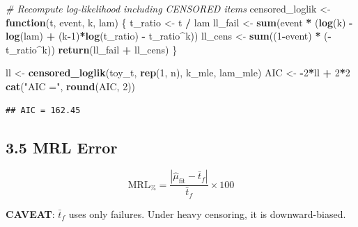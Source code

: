 \documentclass[
]{article}
\newenvironment{Shaded}{\begin{snugshade}}{\end{snugshade}}
\newcommand{\CommentTok}[1]{\textcolor[rgb]{0.56,0.35,0.01}{\textit{#1}}}
\newcommand{\ControlFlowTok}[1]{\textcolor[rgb]{0.13,0.29,0.53}{\textbf{#1}}}
\newcommand{\DecValTok}[1]{\textcolor[rgb]{0.00,0.00,0.81}{#1}}
\newcommand{\FunctionTok}[1]{\textcolor[rgb]{0.13,0.29,0.53}{\textbf{#1}}}
\newcommand{\NormalTok}[1]{#1}
\newcommand{\OtherTok}[1]{\textcolor[rgb]{0.56,0.35,0.01}{#1}}
\newcommand{\SpecialCharTok}[1]{\textcolor[rgb]{0.81,0.36,0.00}{\textbf{#1}}}
\newcommand{\StringTok}[1]{\textcolor[rgb]{0.31,0.60,0.02}{#1}}
\begin{document}
\begin{Shaded}
\begin{Highlighting}[]
\CommentTok{\# Recompute log-likelihood including CENSORED items}
\NormalTok{censored\_loglik }\OtherTok{\textless{}{-}} \ControlFlowTok{function}\NormalTok{(t, event, k, lam) \{}
\NormalTok{  t\_ratio }\OtherTok{\textless{}{-}}\NormalTok{ t }\SpecialCharTok{/}\NormalTok{ lam}
\NormalTok{  ll\_fail }\OtherTok{\textless{}{-}} \FunctionTok{sum}\NormalTok{(event }\SpecialCharTok{*}\NormalTok{ (}\FunctionTok{log}\NormalTok{(k) }\SpecialCharTok{{-}} \FunctionTok{log}\NormalTok{(lam) }\SpecialCharTok{+} \NormalTok{(k}\SpecialCharTok{{-}}\DecValTok{1}\NormalTok{)}\SpecialCharTok{*}\FunctionTok{log}\NormalTok{(t\_ratio) }\SpecialCharTok{{-}}\NormalTok{ t\_ratio}\SpecialCharTok{\^{}}\NormalTok{k))}
\NormalTok{  ll\_cens }\OtherTok{\textless{}{-}} \FunctionTok{sum}\NormalTok{((}\DecValTok{1}\SpecialCharTok{{-}}\NormalTok{event) }\SpecialCharTok{*}\NormalTok{ (}\SpecialCharTok{{-}}\NormalTok{t\_ratio}\SpecialCharTok{\^{}}\NormalTok{k))}
  \FunctionTok{return}\NormalTok{(ll\_fail }\SpecialCharTok{+}\NormalTok{ ll\_cens)}
\NormalTok{\}}

\NormalTok{ll }\OtherTok{\textless{}{-}} \FunctionTok{censored\_loglik}\NormalTok{(toy\_t, }\FunctionTok{rep}\NormalTok{(}\DecValTok{1}\NormalTok{, n), k\_mle, lam\_mle)}
\NormalTok{AIC }\OtherTok{\textless{}{-}} \SpecialCharTok{{-}}\DecValTok{2}\SpecialCharTok{*}\NormalTok{ll }\SpecialCharTok{+} \DecValTok{2}\SpecialCharTok{*}\DecValTok{2}
\FunctionTok{cat}\NormalTok{(}\StringTok{"AIC ="}\NormalTok{, }\FunctionTok{round}\NormalTok{(AIC, }\DecValTok{2}\NormalTok{))}
\end{Highlighting}
\end{Shaded}

\begin{verbatim}
## AIC = 162.45
\end{verbatim}

\subsection{3.5 MRL Error}\label{mrl-error}

\[\text{MRL}_{\%} = \frac{|\hat{\mu}_{\text{fit}} - \bar{t}_f|}{\bar{t}_f} \times 100\]

\textbf{CAVEAT}: \(\bar{t}_f\) uses only failures. Under heavy
censoring, it is downward-biased.
\end{document}
